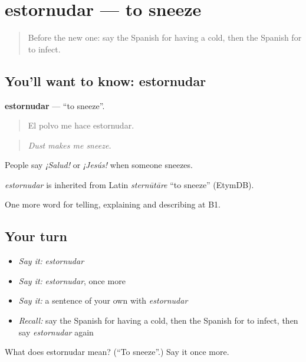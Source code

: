 \section[estornudar]{estornudar — to sneeze}

\label{lesson:ES-C733-estornudar}



\begin{quote}
Before the new one: say the Spanish for having a cold, then the Spanish for to infect.
\end{quote}

\subsection*{You'll want to know: estornudar}
\textbf{estornudar} — \textquotedblleft{}to sneeze\textquotedblright{}.

\begin{quote}
El polvo me hace estornudar.
\end{quote}

\begin{quote}
\emph{Dust makes me sneeze.}
\end{quote}

People say \emph{¡Salud!} or \emph{¡Jesús!} when someone sneezes.

\begin{cousinweb}
\emph{estornudar} is inherited from Latin \emph{sternūtāre} \textquotedblleft{}to sneeze\textquotedblright{} (EtymDB).
\end{cousinweb}

\begin{grammarlens}[title={What you've built}]
One more word for telling, explaining and describing at B1.
\end{grammarlens}

\subsection*{Your turn}
\begin{itemize}
\raggedright
  \item \emph{Say it:} \emph{estornudar}
  \item \emph{Say it:} \emph{estornudar}, once more
  \item \emph{Say it:} a sentence of your own with \emph{estornudar}
  \item \emph{Recall:} say the Spanish for having a cold, then the Spanish for to infect, then say \emph{estornudar} again
\end{itemize}

\begin{tcolorbox}[breakable,colback=teal!4,colframe=teal!35!black,title={Before you move on}]
What does estornudar mean? (\textquotedblleft{}To sneeze\textquotedblright{}.) Say it once more.
\end{tcolorbox}
